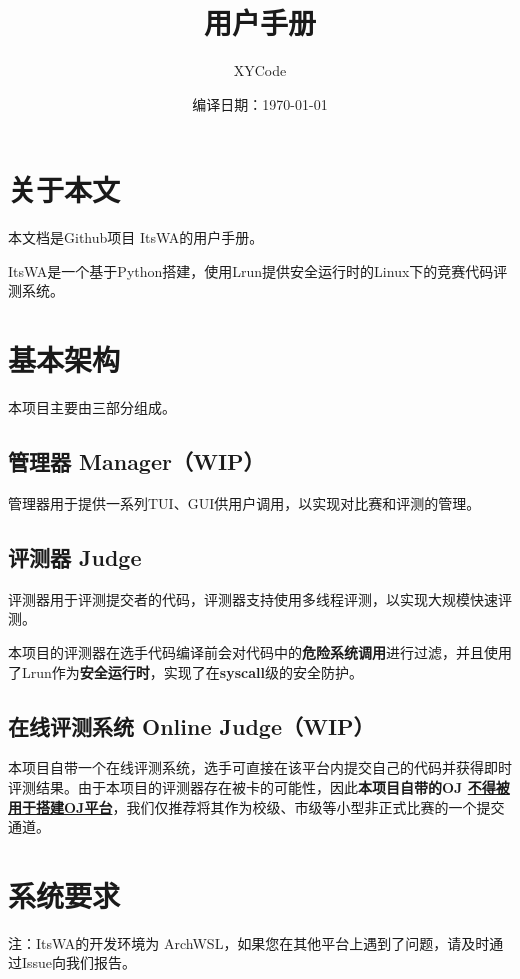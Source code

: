 \documentclass[UTF8]{ctexart}
\title{\textbf{\itswa 用户手册}}
\author{XYCode}
\date{编译日期：\today}
\newcommand{\itswa}{ItsWA}
\begin{document}
    \maketitle

    \tableofcontents

    \section*{关于本文}
        本文档是Github项目 \itswa 的用户手册。

        \itswa 是一个基于Python搭建，使用Lrun提供安全运行时的Linux下的竞赛代码评测系统。
    
    \section{基本架构}
        本项目主要由三部分组成。

        \subsection{管理器 Manager（WIP）}
            管理器用于提供一系列TUI、GUI供用户调用，以实现对比赛和评测的管理。

        \subsection{评测器 Judge}
            评测器用于评测提交者的代码，评测器支持使用多线程评测，以实现大规模快速评测。

            本项目的评测器在选手代码编译前会对代码中的\textbf{危险系统调用}进行过滤，并且使用了Lrun作为\textbf{安全运行时}，实现了在\textbf{syscall}级的安全防护。

        \subsection{在线评测系统 Online Judge（WIP）}
            本项目自带一个在线评测系统，选手可直接在该平台内提交自己的代码并获得即时评测结果。由于本项目的评测器存在被卡的可能性，因此\textbf{本项目自带的OJ \uline{不得被用于搭建OJ平台}}，我们仅推荐将其作为校级、市级等小型非正式比赛的一个提交通道。
    
    \section{系统要求}
        注：\itswa 的开发环境为 ArchWSL，如果您在其他平台上遇到了问题，请及时通过Issue向我们报告。
\end{document}
